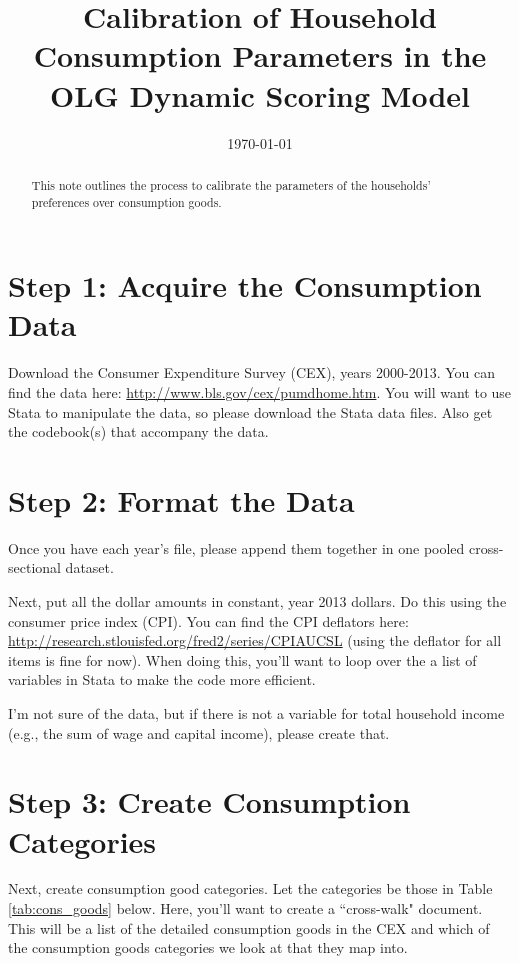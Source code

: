 \documentclass[article,11pt,letterpaper,fleqn]{article}
\title{Calibration of Household Consumption Parameters in the OLG Dynamic Scoring Model}
\date{\today}
\theoremstyle{definition}
\numberwithin{equation}{section}
\begin{document}

\maketitle



\begin{abstract}
This note outlines the process to calibrate the parameters of the households' preferences over consumption goods.
\end{abstract}

\section{Step 1: Acquire the Consumption Data}
\label{sec:step1}

Download the Consumer Expenditure Survey (CEX), years 2000-2013.  You can find the data here: \href{http://www.bls.gov/cex/pumdhome.htm}{http://www.bls.gov/cex/pumdhome.htm}.  You will want to use Stata to manipulate the data, so please download the Stata data files.  Also get the codebook(s) that accompany the data.

\section*{Step 2: Format the Data}
\label{sec:step2}

Once you have each year's file, please append them together in one pooled cross-sectional dataset.  

Next, put all the dollar amounts in constant, year 2013 dollars.  Do this using the consumer price index (CPI).  You can find the CPI deflators here: \\ \href{http://research.stlouisfed.org/fred2/series/CPIAUCSL}{http://research.stlouisfed.org/fred2/series/CPIAUCSL} (using the deflator for all items is fine for now).  When doing this, you'll want to loop over the a list of variables in Stata to make the code more efficient.

I'm not sure of the data, but if there is not a variable for total household income (e.g., the sum of wage and capital income), please create that.

\section*{Step 3: Create Consumption Categories}
\label{sec:step3}

Next, create consumption good categories.  Let the categories be those in Table \ref{tab:cons_goods} below.  Here, you'll want to create a ``cross-walk" document.  This will be a list of the detailed consumption goods in the CEX and which of the consumption goods categories we look at that they map into.
\end{document}
